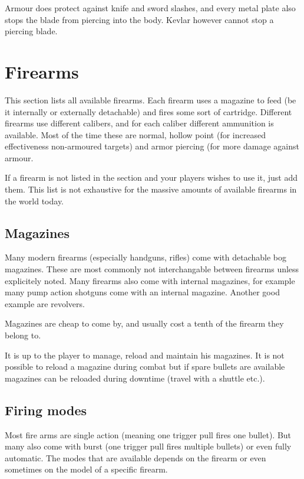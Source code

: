 Armour does protect against knife and sword slashes, and every metal plate
also stops the blade from piercing into the body. Kevlar however cannot stop
a piercing blade.

\section{Firearms}
\label{sec:9-Firearms}

This section lists all available firearms. Each firearm uses a magazine to feed
(be it internally or externally detachable) and fires some sort of cartridge.
Different firearms use different calibers, and for each caliber different
ammunition is available. Most of the time these are normal, hollow point (for
increased effectiveness non-armoured targets) and armor piercing (for more
damage against armour.

If a firearm is not listed in the section and your players wishes to use it,
just add them. This list is not exhaustive for the massive amounts of available
firearms in the world today.

\subsection{Magazines}
\label{sub:9-Magazines}

Many modern firearms (especially handguns, rifles) come with detachable bog
magazines. These are most commonly not interchangable between firearms unless
explicitely noted. Many firearms also come with internal magazines, for example
many pump action shotguns come with an internal magazine. Another good example
are revolvers.

Magazines are cheap to come by, and usually cost a tenth of the firearm they
belong to.

It is up to the player to manage, reload and maintain his magazines. It is not
possible to reload a magazine during combat but if spare bullets are available
magazines can be reloaded during downtime (travel with a shuttle etc.).

\subsection{Firing modes}
\label{sub:9-Firing modes}

Most fire arms are single action (meaning one trigger pull fires one bullet).
But many also come with burst (one trigger pull fires multiple bullets) or
even fully automatic. The modes that are available depends on the firearm or
even sometimes on the model of a specific firearm.

